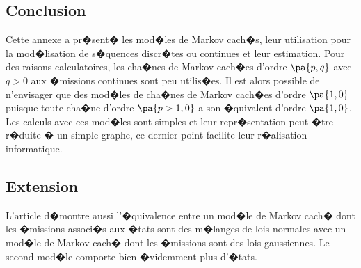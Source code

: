 \subsection{Conclusion}


Cette annexe a pr�sent� les mod�les de Markov cach�s, leur utilisation pour la mod�lisation de s�quences discr�tes ou continues et leur estimation. Pour des raisons calculatoires, les cha�nes de Markov cach�es d'ordre $\pa{p,q}$ avec $q>0$ aux �missions continues sont peu utilis�es. Il est alors possible de n'envisager que des mod�les de cha�nes de Markov cach�es d'ordre $\pa{1,0}$ puisque toute cha�ne d'ordre $\pa{p>1,0}$ a son �quivalent d'ordre $\pa{1,0}$. Les calculs avec ces mod�les sont simples et leur repr�sentation peut �tre r�duite � un simple graphe, ce dernier point facilite leur r�alisation informatique.



\subsection{Extension}


L'article  d�montre aussi l'�quivalence entre un mod�le de Markov cach� dont les �missions associ�s aux �tats sont des m�langes de lois normales avec un mod�le de Markov cach� dont les �missions sont des lois gaussiennes. Le second mod�le comporte bien �videmment plus d'�tats.








